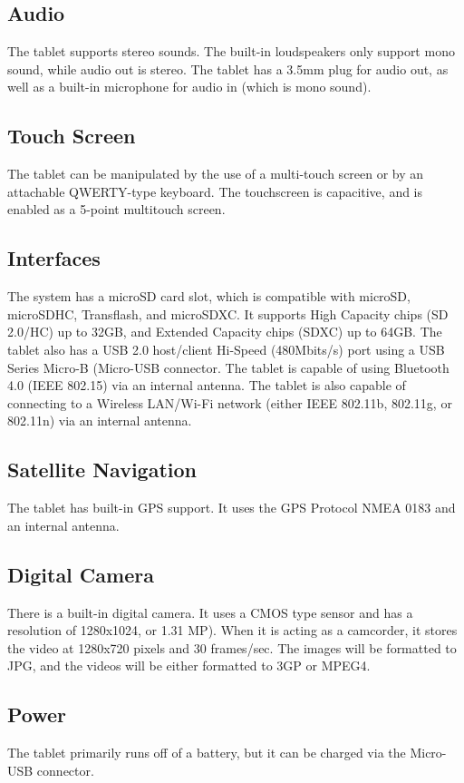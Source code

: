 \documentclass{article}
\begin{document}
\subsection*{ Audio }
The tablet supports stereo sounds. The built\--in loudspeakers only support mono sound, while audio out is stereo. The tablet has a 3.5mm plug for audio out, as well as a built\--in microphone for audio in (which is mono sound).

\subsection*{ Touch Screen }
The tablet can be manipulated by the use of a multi-touch screen or by an attachable QWERTY-type keyboard. The touchscreen is capacitive, and is enabled as a 5-point multitouch screen.  

\subsection*{ Interfaces }
The system has a microSD card slot, which is compatible with microSD, microSDHC, Transflash, and microSDXC. It supports High Capacity chips (SD 2.0/HC) up to 32GB, and Extended Capacity chips (SDXC) up to 64GB. The tablet also has a USB 2.0 host/client Hi-Speed (480Mbits/s) port using a USB Series Micro-B (Micro-USB connector. The tablet is capable of using Bluetooth 4.0 (IEEE 802.15) via an internal antenna.  The tablet is also capable of connecting to a Wireless LAN/Wi\--Fi network (either IEEE 802.11b, 802.11g, or 802.11n) via an internal antenna. 

\subsection*{ Satellite Navigation }
The tablet has built\--in GPS support. It uses the GPS Protocol NMEA 0183 and an internal antenna. 

\subsection*{ Digital Camera }
There is a built\--in digital camera. It uses a CMOS type sensor and has a resolution of 1280x1024, or 1.31 MP). When it is acting as a camcorder, it stores the video at 1280x720 pixels and 30 frames/sec. The images will be formatted to JPG, and the videos will be either formatted to 3GP or MPEG4.  

\subsection*{ Power }
The tablet primarily runs off of a battery, but it can be charged via the Micro-USB connector.
\end{document}
